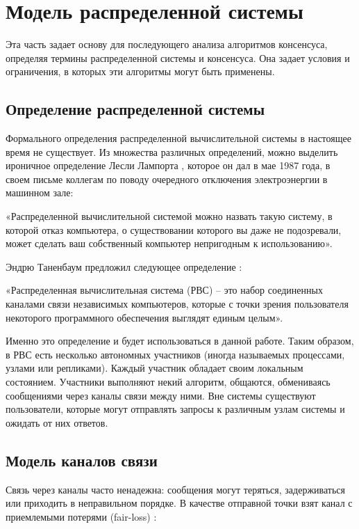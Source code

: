 
\section{Модель распределенной системы}

Эта часть задает основу для последующего анализа алгоритмов консенсуса, определяя
термины распределенной системы и консенсуса. Она задает условия и ограничения,
в которых эти алгоритмы могут быть применены.

\subsection{Определение распределенной системы}

Формального определения распределенной вычислительной системы в настоящее время
не существует. Из множества различных определений, можно выделить ироничное
определение Лесли Лампорта \cite{lamport_email}, которое он дал в мае 1987 года,
в своем письме коллегам по поводу очередного отключения электроэнергии в машинном
зале:

«Распределенной вычислительной системой можно назвать такую систему, в которой
отказ компьютера, о существовании которого вы даже не подозревали, может сделать
ваш собственный компьютер непригодным к использованию».

Эндрю Таненбаум предложил следующее определение \cite{tanenbaum_distributed_systems}:

«Распределенная вычислительная система (РВС) – это набор соединенных каналами
связи независимых компьютеров, которые с точки зрения пользователя некоторого
программного обеспечения выглядят единым целым».

Именно это определение и будет использоваться в данной работе. Таким образом,
в РВС есть несколько автономных участников (иногда называемых процессами, узлами
или репликами). Каждый участник обладает своим локальным состоянием. Участники
выполняют некий алгоритм, общаются, обмениваясь сообщениями через каналы связи
между ними. Вне системы существуют пользователи, которые могут отправлять запросы
к различным узлам системы и ожидать от них ответов.

\subsection{Модель каналов связи}

Связь через каналы часто ненадежна: сообщения могут теряться, задерживаться или
приходить в неправильном порядке. В качестве отправной точки взят канал с
приемлемыми потерями (fair-loss) \cite{cachin11}:

